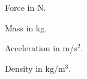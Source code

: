 \begin{symbols}
  \item[$F$] Force in N.
  \item[$m$] Mass in kg.
  \item[$a$] Acceleration in m/s$^2$.
  \item[$\rho$] Density in kg/m$^3$.
\end{symbols}
